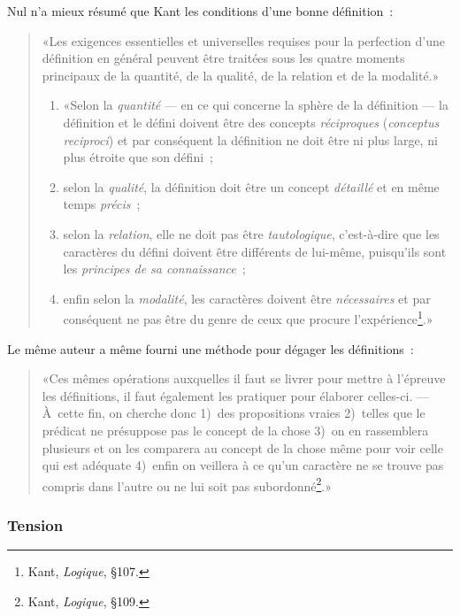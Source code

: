 \documentclass[a4paper,11pt]{article}
\newcommand{\cad}{c'est-à-dire}
\begin{document}
Nul n'a mieux résumé que Kant les conditions d'une bonne définition~:
\begin{quote}
  «Les exigences essentielles et universelles requises pour la
  perfection d'une définition en général peuvent être traitées sous les
  quatre moments principaux de la quantité, de la qualité, de la
  relation et de la modalité.»

  \begin{enumerate}
  \item «Selon la \emph{quantité} --- en ce qui concerne la sphère de la
    définition --- la définition et le défini doivent être des concepts
    \emph{réciproques} (\emph{conceptus reciproci}) et par conséquent la
    définition ne doit être ni plus large, ni plus étroite que son défini~;
  \item selon la \emph{qualité}, la définition doit être un concept
    \emph{détaillé} et en même temps \emph{précis}~;
  \item selon la \emph{relation}, elle ne doit pas être
    \emph{tautologique}, \cad{} que les caractères du défini doivent
    être différents de lui-même, puisqu'ils sont les \emph{principes de
      sa connaissance}~;
  \item enfin selon la \emph{modalité}, les caractères doivent être
    \emph{nécessaires} et par conséquent ne pas être du genre de ceux
    que procure l'expérience\footnote{Kant, \emph{Logique}, §107.}.»
  \end{enumerate}
\end{quote}
Le même auteur a même fourni une méthode pour dégager les définitions~: 
\begin{quote}
  «Ces mêmes opérations auxquelles il faut se livrer pour mettre à
  l'épreuve les définitions, il faut également les pratiquer pour
  élaborer celles-ci. --- À~cette fin, on cherche donc 1)~des
  propositions vraies 2)~telles que le prédicat ne présuppose pas le
  concept de la chose 3)~on en rassemblera plusieurs et on les comparera
  au concept de la chose même pour voir celle qui est adéquate 4)~enfin
  on veillera à ce qu'un caractère ne se trouve pas compris dans l'autre
  ou ne lui soit pas subordonné\footnote{Kant, \emph{Logique}, §109.}.»
\end{quote}



\subsubsection{Tension}
\end{document}
